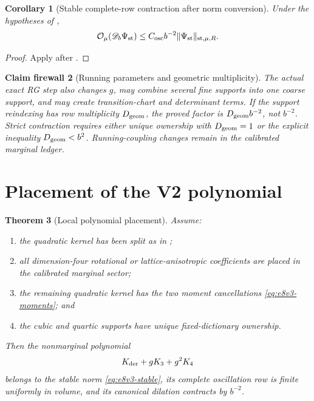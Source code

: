 \documentclass[11pt,oneside]{book}
\newtheorem{theorem}{Theorem}[chapter]
\newtheorem{corollary}[theorem]{Corollary}
\newtheorem{firewall}[theorem]{Claim firewall}
\theoremstyle{definition}
\theoremstyle{remark}
\begin{document}
\begin{corollary}[Stable complete-row contraction after norm
conversion]
\label{cor:e8v3-row-contraction}
Under the hypotheses of
,
\[
 {\cal O}_\mu({\mathscr D}_b\Psi_{\rm st})
 \leq
 C_{\rm osc}b^{-2}
 \|\Psi_{\rm st}\|_{{\rm st},\mu,R}.                 \label{eq:e8v3-row-contraction}
\]
\end{corollary}

\begin{proof}
Apply  after
.
\end{proof}

\begin{firewall}[Running parameters and geometric multiplicity]
\label{fire:e8v3-geometry}
The actual exact RG step also changes \(g\), may combine several fine
supports into one coarse support, and may create transition-chart and
determinant terms.  If the support reindexing has row multiplicity
\(D_{\rm geom}\), the proved factor is
\(D_{\rm geom}b^{-2}\), not \(b^{-2}\).  Strict contraction requires
either unique ownership with \(D_{\rm geom}=1\) or the explicit
inequality \(D_{\rm geom}<b^2\).  Running-coupling changes remain in
the calibrated marginal ledger.
\end{firewall}

\section{Placement of the V2 polynomial}
\label{sec:e8v3-placement}

\begin{theorem}[Local polynomial placement]
\label{thm:e8v3-placement}
Assume:
\begin{enumerate}[label=\textup{(\alph*)},leftmargin=3.5em]
\item the quadratic kernel has been split as in
      ;
\item all dimension-four rotational or lattice-anisotropic
      coefficients are placed in the calibrated marginal sector;
\item the remaining quadratic kernel has the two moment cancellations
      \eqref{eq:e8v3-moments}; and
\item the cubic and quartic supports have unique fixed-dictionary
      ownership.
\end{enumerate}
Then the nonmarginal polynomial
\[
 K_{\rm der}+gK_3+g^2K_4
                                                        \label{eq:e8v3-nonmarginal}
\]
belongs to the stable norm \eqref{eq:e8v3-stable}, its complete
oscillation row is finite uniformly in volume, and its canonical
dilation contracts by \(b^{-2}\).
\end{theorem}
\end{document}
